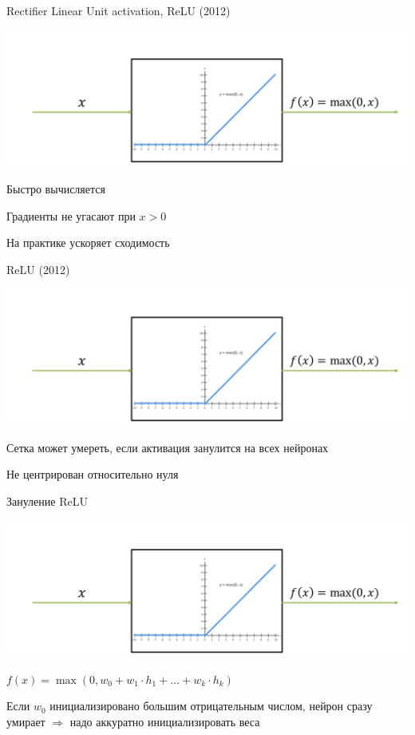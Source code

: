 \documentclass[notes,12pt, aspectratio=169]{beamer}
\newenvironment{wideitemize}{\itemize\addtolength{\itemsep}{10pt}}{\enditemize}
\begin{document}
\begin{frame}{Rectifier Linear Unit activation, ReLU (2012)}
	\begin{center}
		\includegraphics[width=.8\linewidth]{relu_activation.png}
	\end{center}
	\begin{itemize}
		{ \color{green} 
		\item  Быстро вычисляется 
		\item  Градиенты не угасают при $x > 0$
		\item  На практике ускоряет сходимость
		} 
	\end{itemize}
\end{frame}


\begin{frame}{ReLU (2012)}
	\begin{center}
		\includegraphics[width=.8\linewidth]{relu_activation.png}
	\end{center}
	\begin{itemize}
		{ \color{red} 
		\item  Сетка может умереть, если активация занулится на всех нейронах
		\item  Не центрирован относительно нуля
		} 
	\end{itemize}
\end{frame}


\begin{frame}{Зануление ReLU}
	\begin{center}
		\includegraphics[width=.8\linewidth]{relu_activation.png}
	\end{center}
	\begin{wideitemize}
		\item   $f(x) = \max(0, w_0 + w_1 \cdot h_1 + \ldots + w_k \cdot h_k)$
		
		\item  Если $w_0$ инициализировано большим отрицательным числом, нейрон сразу умирает $\Rightarrow$ надо аккуратно инициализировать веса
	\end{wideitemize}
\end{frame}
\end{document}
